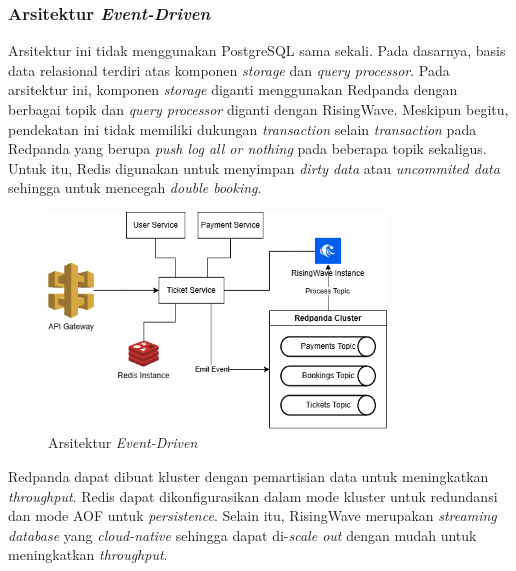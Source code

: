 \subsubsection{Arsitektur \textit{Event-Driven}}

Arsitektur ini tidak menggunakan PostgreSQL sama sekali. Pada dasarnya, basis data relasional terdiri atas komponen \textit{storage} dan \textit{query processor}. Pada arsitektur ini, komponen \textit{storage} diganti menggunakan Redpanda dengan berbagai topik dan \textit{query processor} diganti dengan RisingWave. Meskipun begitu, pendekatan ini tidak memiliki dukungan \textit{transaction} selain \textit{transaction} pada Redpanda yang berupa \textit{push log all or nothing} pada beberapa topik sekaligus. Untuk itu, Redis digunakan untuk menyimpan \textit{dirty data} atau \textit{uncommited data} sehingga untuk mencegah \textit{double booking}.

\begin{figure}[ht]
  \centering
  \includegraphics[width=0.8\textwidth]{resources/chapter-3/architecture-event-driven.png}
  \caption{Arsitektur \textit{Event-Driven}}
  \label{fig:solution-event-driven-architecture}
\end{figure}

Redpanda dapat dibuat kluster dengan pemartisian data untuk meningkatkan \textit{throughput}. Redis dapat dikonfigurasikan dalam mode kluster untuk redundansi dan mode AOF untuk \textit{persistence}. Selain itu, RisingWave merupakan \textit{streaming database} yang \textit{cloud-native} sehingga dapat di-\textit{scale out} dengan mudah untuk meningkatkan \textit{throughput}.

